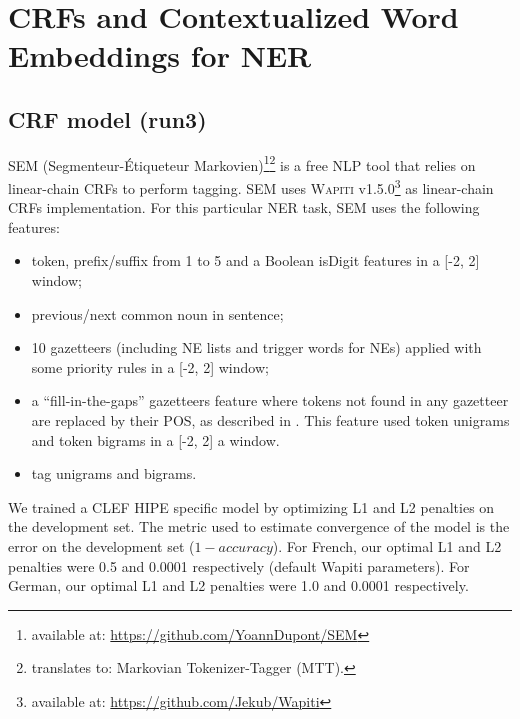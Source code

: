\section{CRFs and Contextualized Word Embeddings for NER}
\label{sec:method}


\subsection{CRF model (run3)}

SEM (Segmenteur-Étiqueteur Markovien)\footnote{available at: \url{https://github.com/YoannDupont/SEM}}\footnote{translates to: Markovian Tokenizer-Tagger (MTT).} \cite{dupont-2017-exploration} is a free NLP tool that relies on linear-chain CRFs \cite{lafferty-etal-2001-conditional} to perform tagging. SEM uses \textsc{Wapiti} \cite{lavergne-etal-2010-practical} v1.5.0\footnote{available at: \url{https://github.com/Jekub/Wapiti}} as linear-chain CRFs implementation. For this particular NER task, SEM uses the following features:
\begin{itemize}
    \item token, prefix/suffix from 1 to 5 and a Boolean isDigit features in a [-2, 2] window; %
    \item previous/next common noun in sentence;
    \item 10 gazetteers (including NE lists and trigger words for NEs) applied with some priority rules in a [-2, 2] window;
    \item a ``fill-in-the-gaps'' gazetteers feature where tokens not found in any gazetteer are replaced by their POS, as described in \cite{raymond-fayolle-2010-reconnaissance}. This feature used token unigrams and token bigrams in a [-2, 2] a window.
    \item tag unigrams and bigrams.
\end{itemize}

We trained a CLEF HIPE specific model by optimizing L1 and L2 penalties on the development set. The metric used to estimate convergence of the model is the error on the development set ($1 - accuracy$).
For French, our optimal L1 and L2 penalties were 0.5 and 0.0001 respectively (default Wapiti parameters).
For German, our optimal L1 and L2 penalties were 1.0 and 0.0001 respectively.

